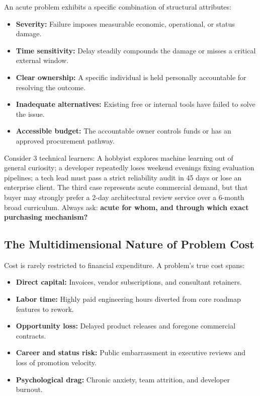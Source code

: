 An acute problem exhibits a specific combination of structural attributes:
\begin{itemize}[leftmargin=1.2em,itemsep=0.2ex]
  \item \textbf{Severity:} Failure imposes measurable economic, operational, or status damage.
  \item \textbf{Time sensitivity:} Delay steadily compounds the damage or misses a critical external window.
  \item \textbf{Clear ownership:} A specific individual is held personally accountable for resolving the outcome.
  \item \textbf{Inadequate alternatives:} Existing free or internal tools have failed to solve the issue.
  \item \textbf{Accessible budget:} The accountable owner controls funds or has an approved procurement pathway.
\end{itemize}

Consider 3 technical learners: A hobbyist explores machine learning out of general curiosity; a developer repeatedly loses weekend evenings fixing evaluation pipelines; a tech lead must pass a strict reliability audit in 45 days or lose an enterprise client. The third case represents acute commercial demand, but that buyer may strongly prefer a 2-day architectural review service over a 6-month broad curriculum. Always ask: \textbf{acute for whom, and through which exact purchasing mechanism?}

\subsection{The Multidimensional Nature of Problem Cost}

Cost is rarely restricted to financial expenditure. A problem's true cost spans:
\begin{itemize}[leftmargin=1.2em,itemsep=0.2ex]
  \item \textbf{Direct capital:} Invoices, vendor subscriptions, and consultant retainers.
  \item \textbf{Labor time:} Highly paid engineering hours diverted from core roadmap features to rework.
  \item \textbf{Opportunity loss:} Delayed product releases and foregone commercial contracts.
  \item \textbf{Career and status risk:} Public embarrassment in executive reviews and loss of promotion velocity.
  \item \textbf{Psychological drag:} Chronic anxiety, team attrition, and developer burnout.
\end{itemize}

